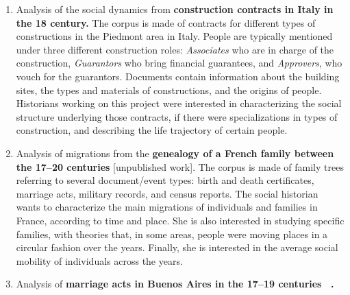 \begin{enumerate}[nosep,leftmargin=*]
    \item Analysis of the social dynamics from \textbf{construction contracts in Italy in the 18 century\cite{Cristofoli2018, Rolla2018}.}
    The corpus is made of contracts for different types of constructions in the Piedmont area in Italy. People are typically mentioned under three different construction roles: \textit{Associates} who are in charge of the construction, \textit{Guarantors} who bring financial guarantees, and \textit{Approvers}, who vouch for the guarantors. Documents contain information about the building sites, the types and materials of constructions, and the origins of people. Historians working on this project were interested in characterizing the social structure underlying those contracts, if there were specializations in types of construction, and describing the life trajectory of certain people.
    \item Analysis of migrations from the \textbf{genealogy of a French family between the 17--20 centuries} [unpublished work].
    The corpus is made of family trees referring to several document/event types: birth and death certificates, marriage acts, military records, and census reports.
    The social historian wants to characterize the main migrations of individuals and families in France, according to time and place.
    She is also interested in studying specific families, with theories that, in some areas, people were moving places in a circular fashion over the years.
    Finally, she is interested in the average social mobility of individuals across the years.
    \item Analysis of \textbf{marriage acts in Buenos Aires in the 17--19 centuries ~\cite{moutoukiasBuenosAiresPort2016, rueda1989matrimonios}.}

\end{enumerate}
